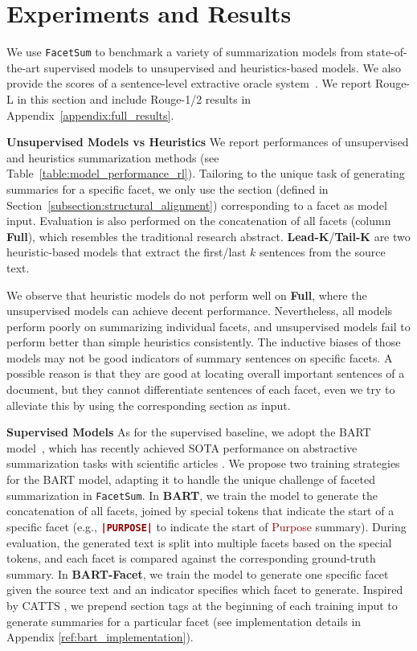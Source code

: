 \documentclass[11pt,a4paper]{article}
\newcommand{\ours}{\texttt{FacetSum}\xspace}
\newcommand{\absp}{\textcolor{darkred}{Purpose}\xspace}
\newcommand{\bart}{BART\xspace}
\newcommand{\bartf}{BART-Facet\xspace}
\newcommand{\code}[1]{\texttt{#1}}
\newcommand{\cmd}[1]{\textcolor{darkred}{\textbf{\small{\code{#1}}}}}
\begin{document}
\section{Experiments and Results}
\label{section:exp}
We use \ours to benchmark a variety of summarization models from state-of-the-art supervised models to unsupervised and heuristics-based models.
We also provide the scores of a sentence-level extractive oracle system~\cite{nallapati2017summarunner}. We report Rouge-L in this section and include Rouge-1/2 results in Appendix~\ref{appendix:full_results}.

\noindent\textbf{Unsupervised Models vs Heuristics}\quad
We report performances of unsupervised and heuristics summarization methods  (see Table~\ref{table:model_performance_rl}). 
Tailoring to the unique task of generating summaries for a specific facet, we only use the section (defined in Section~\ref{subsection:structural_alignment}) corresponding to a facet as model input.
Evaluation is also performed on the concatenation of all facets (column \textbf{Full}), which resembles the traditional research abstract.
\textbf{Lead-K}/\textbf{Tail-K} are two heuristic-based models that extract the first/last $k$ sentences from the source text.



We observe that heuristic models do not perform well on \textbf{Full}, where the unsupervised models can achieve decent performance.
Nevertheless, all models perform poorly on summarizing individual facets, and unsupervised models fail to perform better than simple heuristics consistently.
The inductive biases of those models may not be good indicators of summary sentences on specific facets. A possible reason is that they are good at locating overall important sentences of a document, but they cannot differentiate sentences of each facet, even we try to alleviate this by using the corresponding section as input. 






\noindent\textbf{Supervised Models}\quad
As for the supervised baseline, we adopt the \bart model~\citep{lewis2020bart}, which has recently achieved SOTA performance on abstractive summarization tasks with scientific articles \citep{cachola2020tldr}.
We propose two training strategies for the \bart model, adapting it to handle the unique challenge of faceted summarization in \ours.
In \textbf{\bart}, we train the model to generate the concatenation of all facets, joined by special tokens that indicate the start of a specific facet (e.g., \cmd{|PURPOSE|} to indicate the start of \absp summary). 
During evaluation, the generated text is split into multiple facets based on the special tokens, and each facet is compared against the corresponding ground-truth summary.
In \textbf{\bartf}, we train the model to generate one specific facet given the source text and an indicator specifies which facet to generate.
Inspired by CATTS \citep{cachola2020tldr}, we prepend section tags at the beginning of each training input to generate summaries for a particular facet (see implementation details in Appendix \ref{ref:bart_implementation}). 
\end{document}
